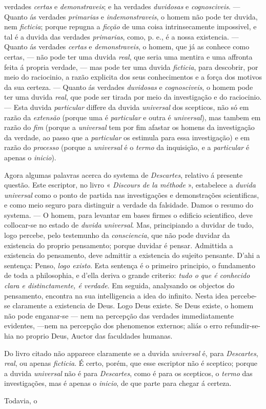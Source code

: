 verdades \emph{certas} e \emph{demonstraveis}; e ha verdades \emph{duvidosas} e \emph{cognosciveis}. --- Quanto ás verdades \emph{primarias} e \emph{indemonstraveis}, o homem não pode ter duvida, nem \emph{ficticia}; porque repugna a \emph{ficção} de uma coisa intrinsecamente impossivel, e tal é a duvida das verdades \emph{primarias}, como, p. e., é a nossa existencia. --- Quanto ás verdades \emph{certas} e \emph{demonstraveis}, o homem, que já as conhece como certas, --- não pode ter uma duvida \emph{real}, que seria uma mentira e uma affronta feita á propria verdade, --- mas pode ter uma duvida \emph{ficticia}, para descobrir, por meio do raciocinio, a razão explicita dos seus conhecimentos e a força dos motivos da sua certeza. --- Quanto ás verdades \emph{duvidosas} e \emph{cognosciveis}, o homem pode ter uma duvida \emph{real}, que pode ser tirada por meio da investigação e do raciocinio. --- Esta duvida \emph{particular} differe da duvida \emph{universal} dos scepticos, não só em razão da \emph{extensão} (porque uma é \emph{particular} e outra é \emph{universal}), mas tambem em razão do \emph{fim} (porque a \emph{universal} tem por fim afastar os homens da investigação da verdade, ao passo que a \emph{particular} os estimula para essa investigação) e em razão do \emph{processo} (porque a \emph{universal} é o \emph{termo} da inquisição, e a \emph{particular} é apenas o \emph{inicio}).\par *\par Agora algumas palavras acerca do systema de \emph{Descartes}, relativo á presente questão. Este escriptor, no livro « \emph{Discours de la méthode} », estabelece a \emph{duvida universal} como o ponto de partida nas investigações e demonstrações scientificas, e como meio seguro para distinguir a verdade da falsidade. Damos o resumo do systema. --- O homem, para levantar em bases firmes o edificio scientifico, deve collocar-se no estado de \emph{duvida universal}. Mas, principiando a duvidar de tudo, logo percebe, pelo testemunho da \emph{consciencia}, que não pode duvidar da existencia do proprio pensamento; porque duvidar é pensar. Admittida a existencia do pensamento, deve admittir a existencia do sujeito pensante. D'ahi a sentença: Penso, \emph{logo existo}. Esta sentença é o primeiro principio, o fundamento de toda a philosophia, e d'ella deriva o grande criterio: \emph{tudo o que é conhecido clara e distinctamente, é verdade}. Em seguida, analysando os objectos do pensamento, encontra na sua intelligencia a idea do infinito. Nesta idea percebe-se claramente a existencia de Deus. Logo Deus existe. Se Deus existe, o homem não pode enganar-se --- nem na percepção das verdades immediatamente evidentes, ---nem na percepção dos phenomenos externos; aliás o erro refundir-se-hia no proprio Deus, Auctor das faculdades humanas.\par Do livro citado não apparece claramente se a duvida \emph{universal} é, para \emph{Descartes}, \emph{real}, ou apenas \emph{ficticia}. É certo, porém, que esse escriptor não é sceptico; porque a duvida \emph{universal} não é para \emph{Descartes}, como é para os scepticos, o \emph{termo} das investigações, mas é apenas o \emph{inicio}, de que parte para chegar á certeza.\par Todavia, o 